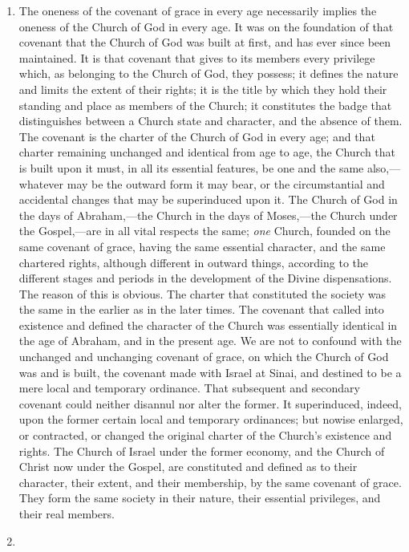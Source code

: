 \documentclass[
  english,
]{book}
\begin{document}
\begin{enumerate}
\def\labelenumi{\arabic{enumi}.}
\item
  The oneness of the covenant of grace in every age necessarily implies the oneness of the Church of God in every age. It was on the foundation of that covenant that the Church of God was built at first, and has ever since been maintained. It is that covenant that gives to its members every privilege which, as belonging to the Church of God, they possess; it defines the nature and limits the extent of their rights; it is the title by which they hold their standing and place as members of the Church; it constitutes the badge that distinguishes between a Church state and character, and the absence of them. The covenant is the charter of the Church of God in every age; and that charter remaining unchanged and identical from age to age, the Church that is built upon it must, in all its essential features, be one and the same also,---whatever may be the outward form it may bear, or the circumstantial and accidental changes that may be superinduced upon it. The Church of God in the days of Abraham,---the Church in the days of Moses,---the Church under the Gospel,---are in all vital respects the same; \emph{one} Church, founded on the same covenant of grace, having the same essential character, and the same chartered rights, although different in outward things, according to the different stages and periods in the development of the Divine dispensations. The reason of this is obvious. The charter that constituted the society was the same in the earlier as in the later times. The covenant that called into existence and defined the character of the Church was essentially identical in the age of Abraham, and in the present age. We are not to confound with the unchanged and unchanging covenant of grace, on which the Church of God was and is built, the covenant made with Israel at Sinai, and destined to be a mere local and temporary ordinance. That subsequent and secondary covenant could neither disannul nor alter the former. It superinduced, indeed, upon the former certain local and temporary ordinances; but nowise enlarged, or contracted, or changed the original charter of the Church's existence and rights. The Church of Israel under the former economy, and the Church of Christ now under the Gospel, are constituted and defined as to their character, their extent, and their membership, by the same covenant of grace. They form the same society in their nature, their essential privileges, and their real members.
\item

\end{enumerate}
\end{document}

